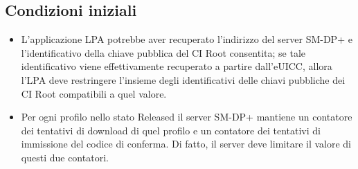 \documentclass[10pt, twoside, openany]{book}
\begin{document}
\subsection{Condizioni iniziali}
\begin{itemize}
\item L'applicazione LPA potrebbe aver recuperato l'indirizzo del server SM-DP+ e l'identificativo della chiave pubblica del CI Root consentita; se tale identificativo viene effettivamente recuperato a partire dall'eUICC, allora l'LPA deve restringere l'insieme degli identificativi delle chiavi pubbliche dei CI Root compatibili a quel valore.
\item Per ogni profilo nello stato Released il server SM-DP+ mantiene un contatore dei tentativi di download di quel profilo e un contatore dei tentativi di immissione del codice di conferma. Di fatto, il server deve limitare il valore di questi due contatori.
\end{itemize}
\end{document}
